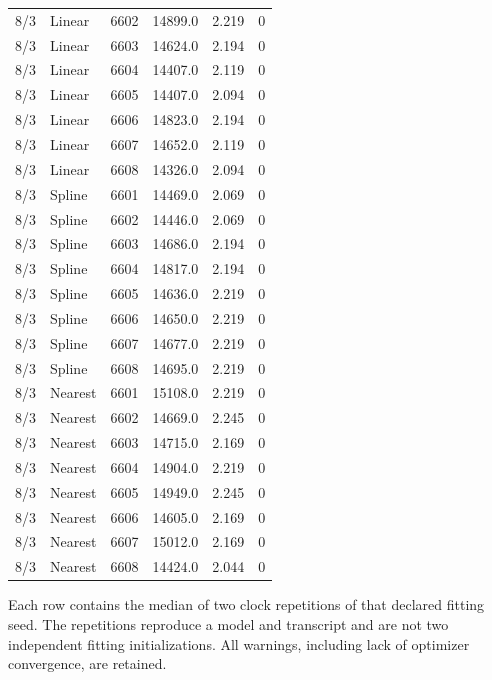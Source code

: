 \begin{longtable}{rlrrrr}
8/3 & Linear & 6602 & 14899.0 & 2.219 & 0 \\
8/3 & Linear & 6603 & 14624.0 & 2.194 & 0 \\
8/3 & Linear & 6604 & 14407.0 & 2.119 & 0 \\
8/3 & Linear & 6605 & 14407.0 & 2.094 & 0 \\
8/3 & Linear & 6606 & 14823.0 & 2.194 & 0 \\
8/3 & Linear & 6607 & 14652.0 & 2.119 & 0 \\
8/3 & Linear & 6608 & 14326.0 & 2.094 & 0 \\
8/3 & Spline & 6601 & 14469.0 & 2.069 & 0 \\
8/3 & Spline & 6602 & 14446.0 & 2.069 & 0 \\
8/3 & Spline & 6603 & 14686.0 & 2.194 & 0 \\
8/3 & Spline & 6604 & 14817.0 & 2.194 & 0 \\
8/3 & Spline & 6605 & 14636.0 & 2.219 & 0 \\
8/3 & Spline & 6606 & 14650.0 & 2.219 & 0 \\
8/3 & Spline & 6607 & 14677.0 & 2.219 & 0 \\
8/3 & Spline & 6608 & 14695.0 & 2.219 & 0 \\
8/3 & Nearest & 6601 & 15108.0 & 2.219 & 0 \\
8/3 & Nearest & 6602 & 14669.0 & 2.245 & 0 \\
8/3 & Nearest & 6603 & 14715.0 & 2.169 & 0 \\
8/3 & Nearest & 6604 & 14904.0 & 2.219 & 0 \\
8/3 & Nearest & 6605 & 14949.0 & 2.245 & 0 \\
8/3 & Nearest & 6606 & 14605.0 & 2.169 & 0 \\
8/3 & Nearest & 6607 & 15012.0 & 2.169 & 0 \\
8/3 & Nearest & 6608 & 14424.0 & 2.044 & 0 \\
\bottomrule
\end{longtable}
\endgroup
\noindent Each row contains the median of two clock repetitions of that declared fitting seed. The repetitions reproduce a model and transcript and are not two independent fitting initializations. All warnings, including lack of optimizer convergence, are retained.
